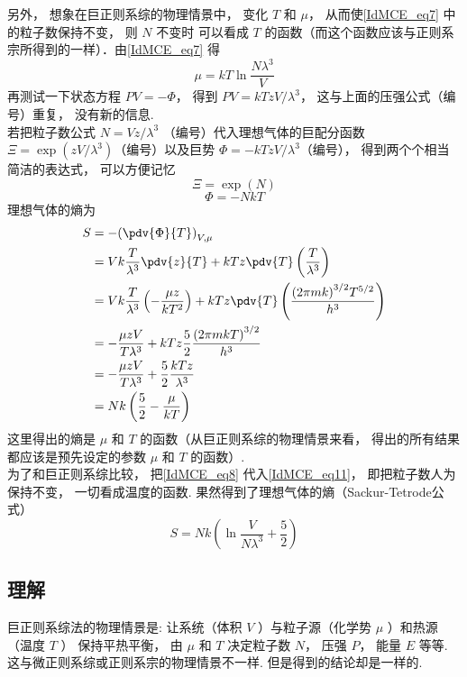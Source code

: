 另外， 想象在巨正则系综的物理情景中， 变化 $T$ 和 $\mu $，  从而使\autoref{IdMCE_eq7} 中的粒子数保持不变， 则 $N$ 不变时 可以看成 $T$ 的函数（而这个函数应该与正则系宗所得到的一样）．由\autoref{IdMCE_eq7} 得
\begin{equation}\label{IdMCE_eq8}
\mu  = kT\ln \frac{{N{\lambda ^3}}}{V}
\end{equation}
再测试一下状态方程 $PV =  - \Phi $，  得到 $PV = kT{{zV}}/{{{\lambda ^3}}}$，  这与上面的压强公式（编号）重复， 没有新的信息.\\
若把粒子数公式 $N = {{Vz}}/{{{\lambda ^3}}}$ （编号）代入理想气体的巨配分函数 $\Xi  = \exp \left( {{{zV}}/{{{\lambda ^3}}}} \right)$（编号）以及巨势 $\Phi  =  - kT{{zV}}/{{{\lambda ^3}}}$（编号）， 得到两个个相当简洁的表达式， 可以方便记忆
\begin{equation}\label{IdMCE_eq9}
\Xi  = \exp \left( N \right)
\end{equation}
\begin{equation}\label{IdMCE_eq10}
\Phi  =  - NkT
\end{equation}
理想气体的熵为
\begin{equation}\label{IdMCE_eq11}
\begin{aligned}
S &=  - {\left( {\pdv{\Phi}{T}} \right)_{V,\mu }} \\
& = Vk\frac{T}{{{\lambda ^3}}}\pdv{z}{T} + kTz\pdv{T} \left( {\frac{T}{{{\lambda ^3}}}} \right) \\
& = Vk\frac{T}{{{\lambda ^3}}}\left( { - \frac{{\mu z}}{{k{T^2}}}} \right) + kTz\pdv{T}\left( {\frac{{{{(2\pi mk)}^{3/2}}{T^{5/2}}}}{{{h^3}}}} \right)\\
& =  - \frac{{\mu zV}}{{T{\lambda ^3}}} + kTz\frac{5}{2}\frac{{{{(2\pi mkT)}^{3/2}}}}{{{h^3}}} \\
& =  - \frac{{\mu zV}}{{T{\lambda ^3}}} + \frac{5}{2}\frac{{kTz}}{{{\lambda ^3}}} \\
& = Nk\left( {\frac{5}{2} - \frac{\mu }{{kT}}} \right){\kern 1pt} {\kern 1pt} {\kern 1pt} {\kern 1pt} {\kern 1pt} {\kern 1pt} {\kern 1pt}
\end{aligned}
\end{equation}
这里得出的熵是 $\mu $ 和 $T$ 的函数（从巨正则系综的物理情景来看， 得出的所有结果都应该是预先设定的参数 $\mu $ 和 $T$ 的函数）.\\
为了和巨正则系综比较， 把\autoref{IdMCE_eq8} 代入\autoref{IdMCE_eq11}，  即把粒子数人为保持不变， 一切看成温度的函数. 果然得到了理想气体的熵（Sackur-Tetrode公式）
\begin{equation}\label{IdMCE_eq12}
S = Nk\left( {\ln \frac{V}{{N{\lambda ^3}}} + \frac{5}{2}} \right)
\end{equation}

\subsection{理解}

巨正则系综法的物理情景是: 让系统（体积 $V$ ）与粒子源（化学势 $\mu $ ）和热源（温度 $T$ ） 保持平热平衡， 由 $\mu $ 和 $T$ 决定粒子数 $N$，  压强 $P$，  能量 $E$ 等等. 这与微正则系综或正则系宗的物理情景不一样. 但是得到的结论却是一样的.

